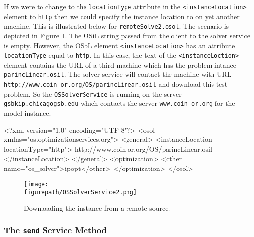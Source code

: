 \documentclass[11pt]{article}
\newcommand{\figurepath}{./figures}
\newcounter{Fig}
\renewcommand{\_}{{\char"5F}}
\renewcommand{\{}{{\char"7B}}
\renewcommand{\}}{{\char"7D}}
\renewcommand{\^}{{\char"0D}}
\renewcommand{\'}{{\char"0D}}
\begin{document}
If we were to change to the {\tt locationType} attribute in the {\tt <instanceLocation>} element to {\tt http} then we could specify the instance location to on yet another machine. This is illustrated below  for {\tt remoteSolve2.osol}.  The scenario is depicted in Figure \ref{figure:ossolverservice2}.  The OSiL string passed from the client to the solver service is empty.  However, the OSoL element {\tt <instanceLocation>}  has an attribute {\tt locationType} equal to   {\tt http}.  In this case, the text of the {\tt <instanceLoction>} element contains the URL of a third machine which has the problem intance {\tt parincLinear.osil}.  The solver service will contact the machine with URL {\tt http://www.coin-or.org/OS/parincLinear.osil} and download this test problem. So the {\tt OSSolverService} is running on the server {\tt gsbkip.chicagogsb.edu} which contacts the server {\tt www.coin-or.org} for the model instance.
\begin{verbatimtab}[4]
<?xml version="1.0" encoding="UTF-8"?>
<osol xmlns="os.optimizationservices.org">
    <general>
         <instanceLocation locationType="http">
	http://www.coin-or.org/OS/parincLinear.osil
	 </instanceLocation>
    </general>
    <optimization>
    	<other name="os_solver">ipopt</other>
    </optimization>
</osol>
\end{verbatimtab}

\begin{figure}
\centering
\texttt{[image: \\figurepath/OSSolverService2.png]}
\caption{Downloading the instance from a remote source.}
\label{figure:ossolverservice2}
\end{figure}

\subsubsection{The  {\tt send} Service Method}\label{section:send}
\end{document}
